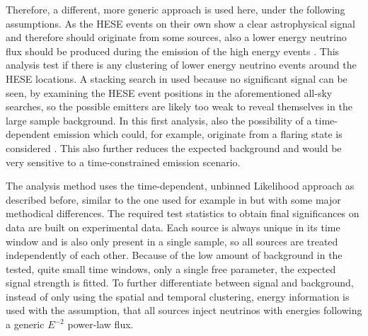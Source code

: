 Therefore, a different, more generic approach is used here, under the following assumptions.
As the HESE events on their own show a clear astrophysical signal and therefore should originate from some sources, also a lower energy neutrino flux should be produced during the emission of the high energy events .
This analysis test if there is any clustering of lower energy neutrino events around the HESE locations.
A stacking search in used because no significant signal can be seen, by examining the HESE event positions in the aforementioned all-sky searches, so the possible emitters are likely too weak to reveal themselves in the large sample background.
In this first analysis, also the possibility of a time-dependent emission which could, for example, originate from a flaring state is considered .
This also further reduces the expected background and would be very sensitive to a time-constrained emission scenario.

The analysis method uses the time-dependent, unbinned Likelihood approach as described before, similar to the one used for example in  but with some major methodical differences.
The required test statistics to obtain final significances on data are built on experimental data.
Each source is always unique in its time window and is also only present in a single sample, so all sources are treated independently of each other.
Because of the low amount of background in the tested, quite small time windows, only a single free parameter, the expected signal strength is fitted.
To further differentiate between signal and background, instead of only using the spatial and temporal clustering, energy information is used with the assumption, that all sources inject neutrinos with energies following a generic $E^{-2}$ power-law flux.



